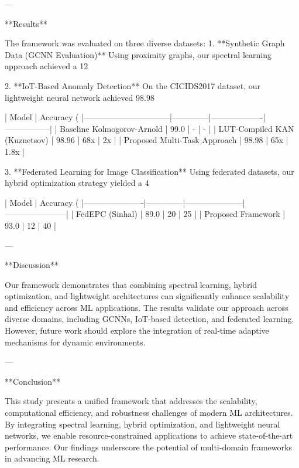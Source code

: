 ---

**Results**  

The framework was evaluated on three diverse datasets:
1. **Synthetic Graph Data (GCNN Evaluation)**  
Using proximity graphs, our spectral learning approach achieved a 12%

2. **IoT-Based Anomaly Detection**  
On the CICIDS2017 dataset, our lightweight neural network achieved 98.98%

| Model                          | Accuracy (%
|--------------------------------|--------------|-------------------|-----------------|
| Baseline Kolmogorov-Arnold     | 99.0         | -                 | -               |
| LUT-Compiled KAN (Kuznetsov)   | 98.96        | 68x              | 2x              |
| Proposed Multi-Task Approach   | 98.98        | 65x              | 1.8x            |

3. **Federated Learning for Image Classification**  
Using federated datasets, our hybrid optimization strategy yielded a 4%

| Model                | Accuracy (%
|----------------------|--------------|---------------------|-----------------------|
| FedEPC (Sinhal)      | 89.0         | 20                  | 25                    |
| Proposed Framework   | 93.0         | 12                  | 40                    |

---

**Discussion**  

Our framework demonstrates that combining spectral learning, hybrid optimization, and lightweight architectures can significantly enhance scalability and efficiency across ML applications. The results validate our approach across diverse domains, including GCNNs, IoT-based detection, and federated learning. However, future work should explore the integration of real-time adaptive mechanisms for dynamic environments.

---

**Conclusion**  

This study presents a unified framework that addresses the scalability, computational efficiency, and robustness challenges of modern ML architectures. By integrating spectral learning, hybrid optimization, and lightweight neural networks, we enable resource-constrained applications to achieve state-of-the-art performance. Our findings underscore the potential of multi-domain frameworks in advancing ML research.

